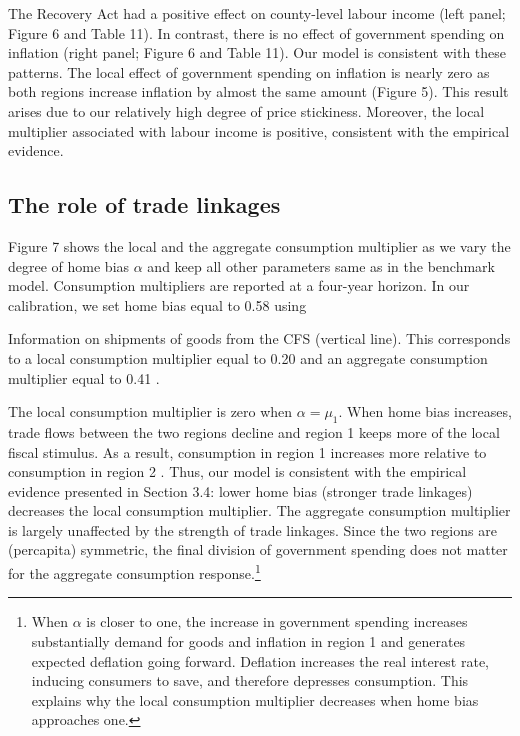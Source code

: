 \documentclass[\latexroot/\projectname]{subfiles}
\begin{document}
The Recovery Act had a positive effect on county-level labour income (left panel; Figure 6 and Table 11). In contrast, there is no effect of government spending on inflation (right panel; Figure 6 and Table 11). Our model is consistent with these patterns. The local effect of government spending on inflation is nearly zero as both regions increase inflation by almost the same amount (Figure 5). This result arises due to our relatively high degree of price stickiness. Moreover, the local multiplier associated with labour income is positive, consistent with the empirical evidence.

\subsection{The role of trade linkages}
Figure 7 shows the local and the aggregate consumption multiplier as we vary the degree of home bias $\alpha$ and keep all other parameters same as in the benchmark model. Consumption multipliers are reported at a four-year horizon. In our calibration, we set home bias equal to 0.58 using





Information on shipments of goods from the CFS (vertical line). This corresponds to a local consumption multiplier equal to 0.20 and an aggregate consumption multiplier equal to 0.41 .

The local consumption multiplier is zero when $\alpha=\mu_{1}$. When home bias increases, trade flows between the two regions decline and region 1 keeps more of the local fiscal stimulus. As a result, consumption in region 1 increases more relative to consumption in region 2 . Thus, our model is consistent with the empirical evidence presented in Section 3.4: lower home bias (stronger trade linkages) decreases the local consumption multiplier. The aggregate consumption multiplier is largely unaffected by the strength of trade linkages. Since the two regions are (percapita) symmetric, the final division of government spending does not matter for the aggregate consumption response.\footnote{When $\alpha$ is closer to one, the increase in government spending increases substantially demand for goods and inflation in region 1 and generates expected deflation going forward. Deflation increases the real interest rate, inducing consumers to save, and therefore depresses consumption. This explains why the local consumption multiplier decreases when home bias approaches one.}
\end{document}
